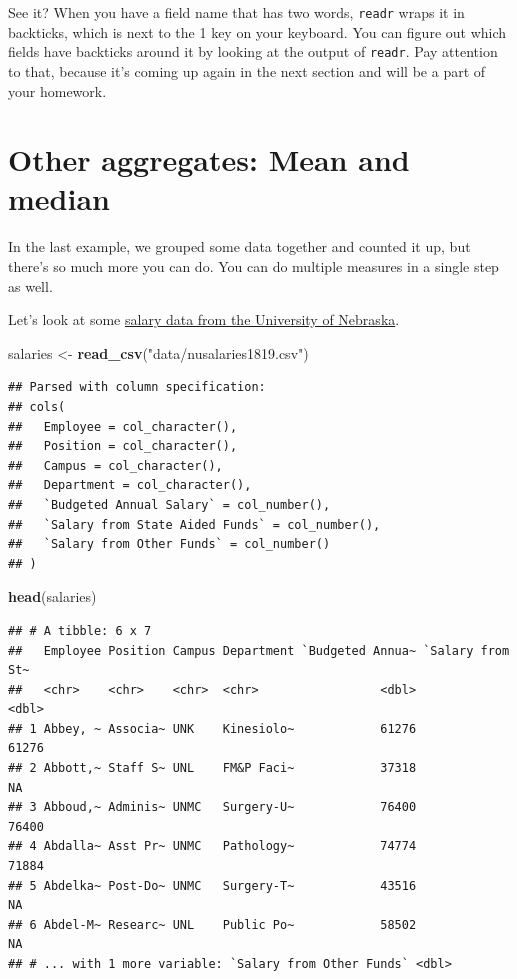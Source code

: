 \documentclass[]{book}
\newenvironment{Shaded}{\begin{snugshade}}{\end{snugshade}}
\newcommand{\KeywordTok}[1]{\textcolor[rgb]{0.13,0.29,0.53}{\textbf{#1}}}
\newcommand{\StringTok}[1]{\textcolor[rgb]{0.31,0.60,0.02}{#1}}
\newcommand{\NormalTok}[1]{#1}
\begin{document}
See it? When you have a field name that has two words, \texttt{readr}
wraps it in backticks, which is next to the 1 key on your keyboard. You
can figure out which fields have backticks around it by looking at the
output of \texttt{readr}. Pay attention to that, because it's coming up
again in the next section and will be a part of your homework.

\section{Other aggregates: Mean and
median}\label{other-aggregates-mean-and-median}

In the last example, we grouped some data together and counted it up,
but there's so much more you can do. You can do multiple measures in a
single step as well.

Let's look at some
\href{https://unl.box.com/s/09t2u4qoncfh6qlv2156flzlxb8ruzpq}{salary
data from the University of Nebraska}.

\begin{Shaded}
\begin{Highlighting}[]
\NormalTok{salaries <-}\StringTok{ }\KeywordTok{read_csv}\NormalTok{(}\StringTok{"data/nusalaries1819.csv"}\NormalTok{)}
\end{Highlighting}
\end{Shaded}

\begin{verbatim}
## Parsed with column specification:
## cols(
##   Employee = col_character(),
##   Position = col_character(),
##   Campus = col_character(),
##   Department = col_character(),
##   `Budgeted Annual Salary` = col_number(),
##   `Salary from State Aided Funds` = col_number(),
##   `Salary from Other Funds` = col_number()
## )
\end{verbatim}

\begin{Shaded}
\begin{Highlighting}[]
\KeywordTok{head}\NormalTok{(salaries)}
\end{Highlighting}
\end{Shaded}

\begin{verbatim}
## # A tibble: 6 x 7
##   Employee Position Campus Department `Budgeted Annua~ `Salary from St~
##   <chr>    <chr>    <chr>  <chr>                 <dbl>            <dbl>
## 1 Abbey, ~ Associa~ UNK    Kinesiolo~            61276            61276
## 2 Abbott,~ Staff S~ UNL    FM&P Faci~            37318               NA
## 3 Abboud,~ Adminis~ UNMC   Surgery-U~            76400            76400
## 4 Abdalla~ Asst Pr~ UNMC   Pathology~            74774            71884
## 5 Abdelka~ Post-Do~ UNMC   Surgery-T~            43516               NA
## 6 Abdel-M~ Researc~ UNL    Public Po~            58502               NA
## # ... with 1 more variable: `Salary from Other Funds` <dbl>
\end{verbatim}
\end{document}
